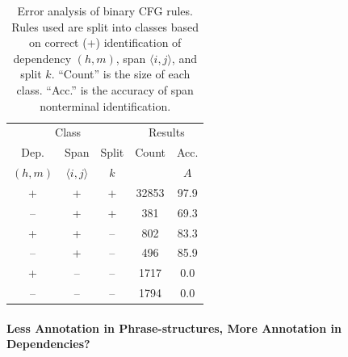 \documentclass[11pt,letterpaper]{article}
\newcommand{\Span}[1]{\langle #1 \rangle}
\begin{document}
\begin{table}
  \centering
  \footnotesize
  \begin{tabular}{|ccc|cc|}
    \hline 
    \multicolumn{3}{|c|}{Class} & \multicolumn{2}{|c|}{Results} \\
    Dep. & Span & Split & Count & Acc.  \\ 
    $(h, m)$ & $\Span{i,j}$ & $k$ &  & $A$ \\ 
    \hline
    + & + & +  &  32853 &  97.9   \\ 
    -- & + & +  &  381 & 69.3   \\ 
    + & + & --  &  802   & 83.3   \\ 
    -- & + & --  &  496 & 85.9   \\ 
    + & -- & --  &  1717 & 0.0    \\ 
    -- & -- & --  &  1794 & 0.0    \\ 
    \hline
  \end{tabular}
  \label{tab:analysis}
  \caption{Error analysis of binary CFG rules. Rules used are split into classes based on 
    correct (+) identification of dependency $(h,m)$, span $\Span{i,j}$, and split $k$. 
    ``Count'' is the size of each class. ``Acc.'' is the accuracy of span nonterminal identification.
  }
\end{table}









\paragraph{Less Annotation in Phrase-structures, More Annotation in Dependencies?}
\end{document}
